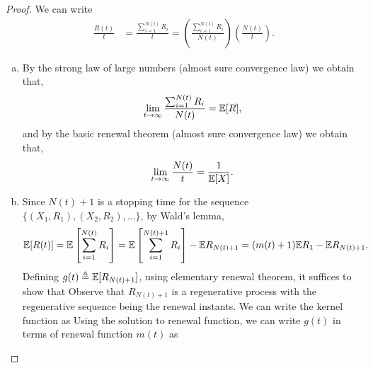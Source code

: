 \documentclass[a4paper,10pt,english]{article}
\begin{document}
\begin{proof}
We can write 
\begin{align*}
\frac{R(t)}{t}&=\frac{\sum_{i=1}^{N(t)}R_i}{t} =\left(\frac{\sum_{i=1}^{N(t)}R_i}{N(t)} \right) \left(\frac{N(t)}{t}\right).
\end{align*}
\begin{enumerate}[(a)]
\item By the strong law of large numbers (almost sure convergence law) we obtain that, 
\begin{align*}
	\lim_{t \to \infty} \frac{\sum_{i=1}^{N(t)}R_i}{N(t)} = \mathbb{E}[R],
\end{align*}
and by the basic renewal theorem (almost sure convergence law) we obtain that, 
\begin{align*}
	\lim_{t \to \infty} \frac{N(t)}{t} = \frac{1}{\mathbb{E}[X]}.
\end{align*} 
\item 
Since $N(t)+1 $ is a stopping time for the sequence $\{(X_1,R_1),(X_2,R_2),\dots\}$, 
by Wald's lemma, %
\begin{align*}
\mathbb{E}[R(t)] &= \mathbb{E}\left[\sum_{i=1}^{N(t)}R_i\right] = \mathbb{E}\left[\sum_{i=1}^{N(t)+1}R_i\right]-\mathbb{E} R_{N(t)+1} = (m(t)+1)\mathbb{E} R_1-\mathbb{E} R_{N(t)+1}.
\end{align*}
Defining $g(t) \triangleq \mathbb{E}[R_{N(t)+1}]$, using elementary renewal theorem, it suffices to show that 
Observe that $R_{N(t)+1}$ is a regenerative process with the regenerative sequence being the renewal instants. 
We can write the kernel function as
Using the solution to renewal function, we can write $g(t)$ in terms of renewal function $m(t)$ as 
\end{enumerate}
\end{proof}
\end{document}
